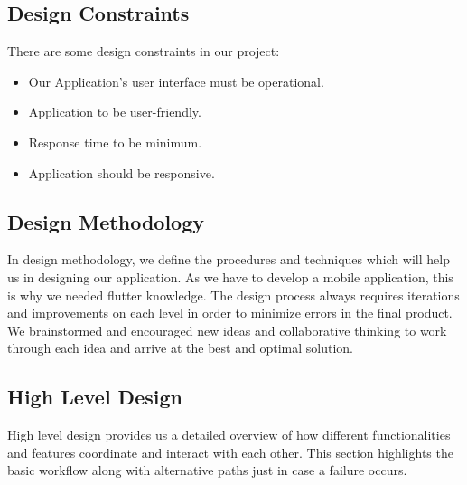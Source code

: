 \documentclass[12pt]{article}
\begin{document}
\newpage
\newpage
\vspace{1 cm} %
\noindent
\subsection{Design Constraints}
\vspace{0.5 cm} %
\noindent

 \normalsize
 There are some design constraints in our project:
 \begin{itemize}
    \item Our Application's user interface must be operational.
    \item Application to be user-friendly.
    \item Response time to be minimum.
    \item Application should be responsive.
\end{itemize}
\vspace{1 cm} %
\noindent
\subsection{Design Methodology}

\vspace{0.5 cm} %
\noindent
 \normalsize
In design methodology, we define the procedures and techniques which will help us in designing our application. As we have to develop a mobile application, this is why we needed flutter knowledge. The design process always requires iterations and improvements on each level in order to minimize errors in the final product. We brainstormed and encouraged new ideas and collaborative thinking to work through each idea and arrive at the best and optimal solution.\cite{khandelwal2022developing}

\vspace{1 cm} %
\noindent
\subsection{High Level Design}

\vspace{0.5 cm} %
\noindent
 \normalsize
High level design provides us a detailed overview of how different functionalities and features coordinate and interact with each other. This section highlights the basic workflow along with alternative paths just in case a failure occurs. 
\newpage
\vspace{1 cm} %
\noindent
\end{document}
